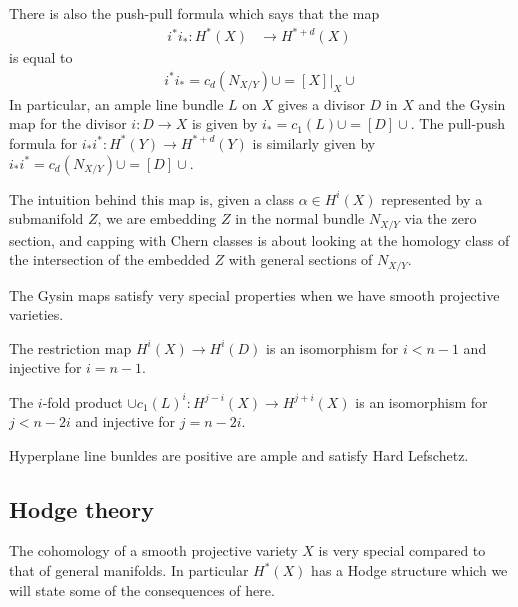 \documentclass[12pt]{article}
\begin{document}
There is also the push-pull formula which says that the map \begin{align*}
    i^*i_*:H^*(X) & \to H^{*+d}(X)\
\end{align*} is equal to \begin{align*}
    i^*i_* = c_d(N_{X/Y})\cup = [X]\vert_X\cup
\end{align*} In particular, an ample line bundle $L$ on $X$ gives a divisor $D$ in $X$ and
the Gysin map for the divisor $i:D\to X$ is given by $i_* = c_1(L)\cup = [D] \cup$.
The pull-push formula for $i_*i^*: H^*(Y) \to H^{*+d}(Y)$ is similarly
given by $i_*i^* = c_d(N_{X/Y})\cup = [D]\cup$.

\begin{remark}
    The intuition behind this map is, given a class $\alpha \in H^i(X)$ represented by
    a submanifold $Z$, we are embedding $Z$ in the normal bundle $N_{X/Y}$ via the zero section,
    and capping with Chern classes is about looking at the homology class of
    the intersection of the embedded $Z$ with general sections of $N_{X/Y}$.
\end{remark}

The Gysin maps satisfy very special properties when we have smooth projective varieties.
\begin{theorem}
     The restriction map $H^i(X)\to H^i(D)$ is an isomorphism for
    $i < n-1 $ and injective for $i = n-1$.
\end{theorem}

\begin{theorem}
    The $i$-fold product $\cup c_1(L)^i:H^{j-i}(X)\to H^{j+i}(X)$ is
    an isomorphism for $j < n-2i$ and injective for $j = n-2i$.
\end{theorem}

\begin{remark}
    Hyperplane line bunldes are positive are ample and satisfy Hard Lefschetz.
\end{remark}
\subsection{Hodge theory}
The cohomology of a smooth projective variety $X$ is very special
compared to that of general manifolds. In particular $H^*(X)$ has a Hodge structure
which we will state some of the consequences of here.
\end{document}

